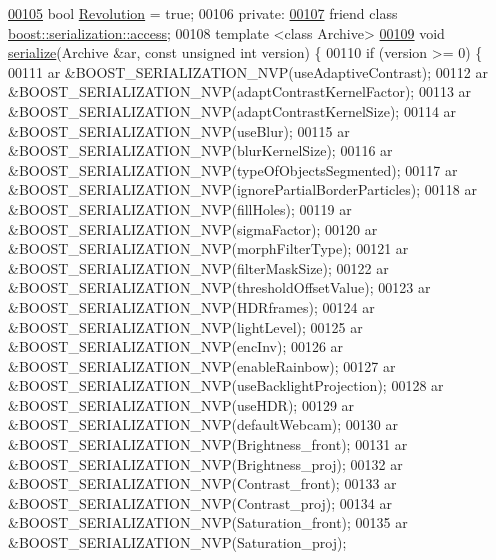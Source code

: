 \begin{DoxyCode}
\hypertarget{soilsettings_8h_source_l00105}{}\hyperlink{class_soil_analyzer_1_1_soil_settings_a72cdc805222bbb57772cb3d9bba7555a}{00105}   \textcolor{keywordtype}{bool} \hyperlink{class_soil_analyzer_1_1_soil_settings_a72cdc805222bbb57772cb3d9bba7555a}{Revolution} = \textcolor{keyword}{true};
00106 \textcolor{keyword}{private}:
\hypertarget{soilsettings_8h_source_l00107}{}\hyperlink{class_soil_analyzer_1_1_soil_settings_ac98d07dd8f7b70e16ccb9a01abf56b9c}{00107}   \textcolor{keyword}{friend} \textcolor{keyword}{class }\hyperlink{class_soil_analyzer_1_1_soil_settings_ac98d07dd8f7b70e16ccb9a01abf56b9c}{boost::serialization::access};
00108   \textcolor{keyword}{template} <\textcolor{keyword}{class} Archive>
\hypertarget{soilsettings_8h_source_l00109}{}\hyperlink{class_soil_analyzer_1_1_soil_settings_ad52138eef4b72905cdaed60bed902646}{00109}   \textcolor{keywordtype}{void} \hyperlink{class_soil_analyzer_1_1_soil_settings_ad52138eef4b72905cdaed60bed902646}{serialize}(Archive &ar, \textcolor{keyword}{const} \textcolor{keywordtype}{unsigned} \textcolor{keywordtype}{int} version) \{
00110     \textcolor{keywordflow}{if} (version >= 0) \{
00111       ar &BOOST\_SERIALIZATION\_NVP(useAdaptiveContrast);
00112       ar &BOOST\_SERIALIZATION\_NVP(adaptContrastKernelFactor);
00113       ar &BOOST\_SERIALIZATION\_NVP(adaptContrastKernelSize);
00114       ar &BOOST\_SERIALIZATION\_NVP(useBlur);
00115       ar &BOOST\_SERIALIZATION\_NVP(blurKernelSize);
00116       ar &BOOST\_SERIALIZATION\_NVP(typeOfObjectsSegmented);
00117       ar &BOOST\_SERIALIZATION\_NVP(ignorePartialBorderParticles);
00118       ar &BOOST\_SERIALIZATION\_NVP(fillHoles);
00119       ar &BOOST\_SERIALIZATION\_NVP(sigmaFactor);
00120       ar &BOOST\_SERIALIZATION\_NVP(morphFilterType);
00121       ar &BOOST\_SERIALIZATION\_NVP(filterMaskSize);
00122       ar &BOOST\_SERIALIZATION\_NVP(thresholdOffsetValue);
00123       ar &BOOST\_SERIALIZATION\_NVP(HDRframes);
00124       ar &BOOST\_SERIALIZATION\_NVP(lightLevel);
00125       ar &BOOST\_SERIALIZATION\_NVP(encInv);
00126       ar &BOOST\_SERIALIZATION\_NVP(enableRainbow);
00127       ar &BOOST\_SERIALIZATION\_NVP(useBacklightProjection);
00128       ar &BOOST\_SERIALIZATION\_NVP(useHDR);
00129       ar &BOOST\_SERIALIZATION\_NVP(defaultWebcam);
00130       ar &BOOST\_SERIALIZATION\_NVP(Brightness\_front);
00131       ar &BOOST\_SERIALIZATION\_NVP(Brightness\_proj);
00132       ar &BOOST\_SERIALIZATION\_NVP(Contrast\_front);
00133       ar &BOOST\_SERIALIZATION\_NVP(Contrast\_proj);
00134       ar &BOOST\_SERIALIZATION\_NVP(Saturation\_front);
00135       ar &BOOST\_SERIALIZATION\_NVP(Saturation\_proj);

\end{DoxyCode}
